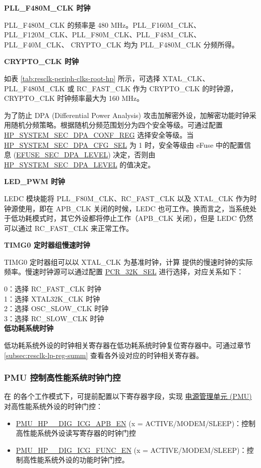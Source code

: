 \documentclass[main\_\_CN.tex]{subfiles}
\begin{document}
\textbf{PLL\_F480M\_CLK 时钟}

PLL\_F480M\_CLK 的频率是 480 MHz。PLL\_F160M\_CLK、 PLL\_F120M\_CLK、PLL\_F80M\_CLK、PLL\_F48M\_CLK、PLL\_F40M\_CLK、 CRYPTO\_CLK 均为 PLL\_F480M\_CLK 分频所得。

\textbf{CRYPTO\_CLK 时钟}

如表 \ref{tab:resclk-periph-clks-root-hp} 所示，可选择 XTAL\_CLK、PLL\_F480M\_CLK 或 RC\_FAST\_CLK 作为 CRYPTO\_CLK 的时钟源，CRYPTO\_CLK 时钟频率最大为 160 MHz。


为了防止 DPA (Differential Power Analysis) 攻击加解密外设，加解密功能时钟采用随机分频策略。根据随机分频范围划分为四个安全等级。可通过配置 \hyperref[regdesc:HPSYSTEMSECDPACONFREG]{HP\_SYSTEM\_SEC\_DPA\_CONF\_REG} 选择安全等级。当 \hyperref[fielddesc:HPSYSTEMSECDPACFGSEL]{HP\_SYSTEM\_SEC\_DPA\_CFG\_SEL} 为 1 时，安全等级由 eFuse 中的配置信息 (\hyperref[fielddesc:EFUSESECDPALEVEL]{EFUSE\_SEC\_DPA\_LEVEL}) 决定，否则由 \hyperref[fielddesc:HPSYSTEMSECDPALEVEL]{HP\_SYSTEM\_SEC\_DPA\_LEVEL} 的值决定。

\textbf{LED\_PWM 时钟}

LEDC 模块能将 PLL\_F80M\_CLK、RC\_FAST\_CLK 以及 XTAL\_CLK 作为时钟源使用，即在 APB\_CLK 关闭的时候，LEDC 也可工作。换而言之，当系统处于低功耗模式时，其它外设都将停止工作（APB\_CLK 关闭），但是 LEDC 仍然可以通过 RC\_FAST\_CLK 来正常工作。

\textbf{TIMG0 定时器组慢速时钟}
\label{sec:pcr_peri_timg}

TIMG0 定时器组可以以 XTAL\_CLK 为基准时钟，计算 \chipseries{} 提供的慢速时钟的实际频率。慢速时钟源可以通过配置 \hyperref[fielddesc:PCR32KSEL]{PCR\_32K\_SEL} 进行选择，对应关系如下：

0：选择 RC\_FAST\_CLK 时钟\\
1：选择 XTAL32K\_CLK 时钟\\
2：选择 OSC\_SLOW\_CLK 时钟\\
3：选择 RC\_SLOW\_CLK 时钟\\

\textbf{低功耗系统时钟}

低功耗系统外设的时钟相关寄存器在低功耗系统时钟复位寄存器中。可通过章节 \ref{subsec:resclk-lp-reg-summ} \textit{} 查看各外设对应的时钟相关寄存器。




\subsubsection{PMU 控制高性能系统时钟门控}
在 \chipname{} 的各个工作模式下，可提前配置以下寄存器字段，实现 \hyperref[mod:lowpowm]{电源管理单元 (PMU)} 对高性能系统外设的时钟门控：
\begin{itemize}
    \item \hyperref[fielddesc:PMUHPACTIVEDIGICGAPBEN]{PMU\_HP\_\_DIG\_ICG\_APB\_EN} (x = ACTIVE/MODEM/SLEEP)：控制高性能系统外设读写寄存器的时钟门控
    \item \hyperref[fielddesc:PMUHPACTIVEDIGICGFUNCEN]{PMU\_HP\_\_DIG\_ICG\_FUNC\_EN} (x = ACTIVE/MODEM/SLEEP)：控制高性能系统外设的功能时钟门控。
\end{itemize}
\end{document}
